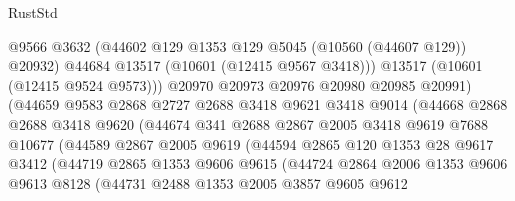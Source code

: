 \begin{lexlean}{RustStd}
\begin{coremodule}
                              @9566
                              @3632
                              (@44602 @129 @1353 @129 @5045 (@10560 (@44607 @129)) @20932)
                              @44684
                              @13517
                              (@10601 (@12415 @9567 @3418)))
                            @13517
                            (@10601 (@12415 @9524 @9573)))
                          @20970
                          @20973
                          @20976
                          @20980
                          @20985
                          @20991)
                        (@44659
                          @9583
                          @2868
                          @2727
                          @2688
                          @3418
                          @9621
                          @3418
                          @9014
                          (@44668
                            @2868
                            @2688
                            @3418
                            @9620
                            (@44674
                              @341
                              @2688
                              @2867
                              @2005
                              @3418
                              @9619
                              @7688
                              @10677
                              (@44589
                                @2867
                                @2005
                                @9619
                                (@44594
                                  @2865
                                  @120
                                  @1353
                                  @28
                                  @9617
                                  @3412
                                  (@44719
                                    @2865
                                    @1353
                                    @9606
                                    @9615
                                    (@44724
                                      @2864
                                      @2006
                                      @1353
                                      @9606
                                      @9613
                                      @8128
                                      (@44731
                                        @2488
                                        @1353
                                        @2005
                                        @3857
                                        @9605
                                        @9612

\end{coremodule}
\end{lexlean}
